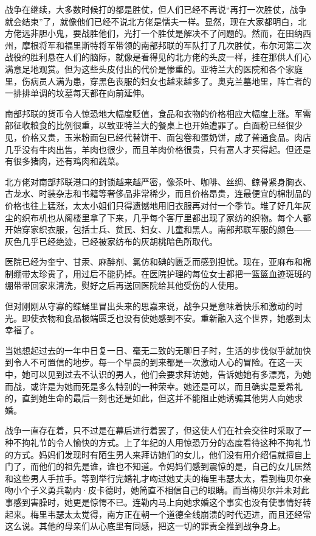 \par 战争在继续，大多数时候打的都是胜仗，但人们已经不再说“再打一次胜仗，战争就会结束”了，就像他们已经不说北方佬是懦夫一样。显然，现在大家都明白，北方佬远非胆小鬼，要战胜他们，光打一个胜仗是解决不了问题的。然而，在田纳西州，摩根将军和福里斯特将军带领的南部邦联的军队打了几次胜仗，布尔河第二次战役的胜利悬在人们的脑际，就像是看得见的北方佬的头皮一样，挂在那供人们心满意足地观赏。但为这些头皮付出的代价是惨重的。亚特兰大的医院和各个家庭里，伤病员人满为患，穿黑色丧服的妇女也越来越多了。奥克兰墓地里，阵亡者的一排排单调的坟墓每天都在向前延伸。
\par 南部邦联的货币令人惊恐地大幅度贬值，食品和衣物的价格相应大幅度上涨。军需部征收粮食的比例很重，以致亚特兰大的餐桌上也开始遭罪了。白面粉已经很少见，价格又贵，玉米粉面包已经代替饼干、面包卷和蛋奶饼，成了普通食品。肉店几乎没有牛肉出售，羊肉也很少，而且羊肉价格很贵，只有富人才买得起。但还是有很多猪肉，还有鸡肉和蔬菜。
\par 北方佬对南部邦联港口的封锁越来越严密，像茶叶、咖啡、丝绸、鲸骨紧身胸衣、古龙水、时装杂志和书籍等奢侈品非常稀少，而且价格昂贵，连最便宜的棉制品的价格也往上猛涨，太太小姐们只得遗憾地用旧衣服再对付一个季节。堆了好几年灰尘的织布机也从阁楼里拿了下来，几乎每个客厅里都出现了家纺的织物。每个人都开始穿家织衣服，包括士兵、贫民、妇女、儿童和黑人。南部邦联军服的颜色——灰色几乎已经绝迹，已经被家纺布的灰胡桃暗色所取代。
\par 医院已经为奎宁、甘汞、麻醉剂、氯仿和碘的匮乏而感到担忧。现在，亚麻布和棉制绷带太珍贵了，用过后不能扔掉。在医院护理的每位女士都把一篮篮血迹斑斑的绷带带回家来清洗，熨好之后再送回医院给其他受伤的人使用。
\par 但对刚刚从守寡的蝶蛹里冒出头来的思嘉来说，战争只是意味着快乐和激动的时光。即使衣物和食品极端匮乏也没有使她感到不安。重新融入这个世界，她感到太幸福了。
\par 当她想起过去的一年中日复一日、毫无二致的无聊日子时，生活的步伐似乎就加快到令人不可置信的地步。每一个早晨的到来都是一次激动人心的冒险。在这一天中，她可以见到过去不认识的男人，他们会要求拜访她，告诉她她有多漂亮，为她而战，或许是为她而死是多么特别的一种荣幸。她还是可以，而且确实是爱希礼的，直到她生命的最后一刻也还是如此，但这并不能阻止她诱骗其他男人向她求婚。
\par 战争一直存在着，只不过是在幕后进行着罢了，但这使人们在社会交往时采取了一种不拘礼节的令人愉快的方式。上了年纪的人用惊恐万分的态度看待这种不拘礼节的方式。妈妈们发现时有陌生男人来拜访她们的女儿，他们没有用介绍信就擅自上门了，而他们的祖先是谁，谁也不知道。令妈妈们感到震惊的是，自己的女儿居然和这些男人手拉手。等到举行完婚礼才吻过她丈夫的梅里韦瑟太太，看到梅贝尔亲吻小个子义勇兵勒内·皮卡德时，她简直不相信自己的眼睛。而当梅贝尔并未对此事感到害臊时，她更是惊愕不已。连勒内马上向她求婚这个事实也没有使事情好转起来。梅里韦瑟太太觉得，南方正在朝一个道德全线崩溃的时代迈进，而且还经常这么说。其他的母亲们从心底里有同感，把这一切的罪责全推到战争身上。
